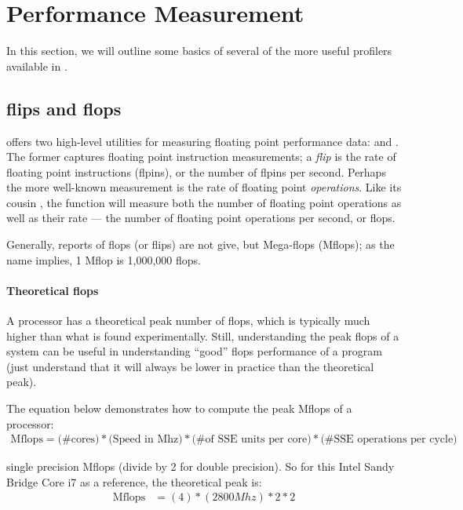 \section{Performance Measurement}

In this section, we will outline some basics of several of the more useful 
profilers available in \thispackage.

\subsection{flips and flops}

\thispackage offers two high-level utilities for measuring floating point 
performance data:  and .  
The former captures floating point instruction measurements; a \textit{flip} is 
the rate of floating point instructions (flpins), or the number of flpins per 
second.  Perhaps the more well-known measurement is the rate of floating point 
\emph{operations}.  Like its cousin , the \thispackage 
function  will measure both the number of floating point 
operations as well as their rate --- the number of floating point operations 
per second, or flops.

Generally, reports of flops (or flips) are not give, but Mega-flops (Mflops); 
as the name implies, 1 Mflop is 1,000,000 flops.



\paragraph{Theoretical flops}

A processor has a theoretical peak number of flops, which is typically much 
higher than what is found experimentally.  Still, understanding the peak flops 
of a system can be useful in understanding ``good'' flops performance of a 
program (just understand that it will always be lower in practice than the 
theoretical peak).

The equation below demonstrates how to compute the peak Mflops of a processor:
\begin{align*}
\text{Mflops} = \text{(\# cores)} * \text{(Speed in Mhz)} *
\text{(\# of SSE units per core)} *  \text{(\# SSE operations per cycle)}
\end{align*}

single precision Mflops (divide by 2 for double precision).  So for this Intel 
Sandy Bridge Core i7 as a reference, the theoretical peak is:
\begin{align*}
\text{Mflops} &= (4) * (2800 Mhz) * 2 * 2
\end{align*}

